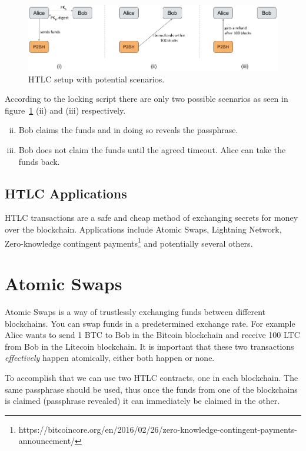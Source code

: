 \begin{figure}[h]
\begin{center}
\includegraphics[scale=0.5]{images/htlc}
\caption{HTLC setup with potential scenarios.}
\label{fig:htlc}
\end{center}
\end{figure}

According to the locking script there are only two possible scenarios as seen in figure~\ref{fig:htlc} (ii) and (iii) respectively.
\begin{enumerate}[(i)]
\setcounter{enumi}{1}
\item Bob claims the funds and in doing so reveals the passphrase.
\item Bob does not claim the funds until the agreed timeout. Alice can take the funds back.
\end{enumerate}

\subsection*{HTLC Applications}
HTLC transactions are a safe and cheap method of exchanging secrets for money over the blockchain. Applications include Atomic Swaps, Lightning Network, Zero-knowledge contingent payments\footnote{https://bitcoincore.org/en/2016/02/26/zero-knowledge-contingent-payments-announcement/} and potentially several others.



\section{Atomic Swaps}
\label{sec:atomic-swaps}
Atomic Swaps is a way of trustlessly exchanging funds between different blockchains. You can swap funds in a predetermined exchange rate. For example Alice wants to send 1 BTC to Bob in the Bitcoin blockchain and receive 100 LTC from Bob in the Litecoin blockchain. It is important that these two transactions \emph{effectively} happen atomically, either both happen or none.

To accomplish that we can use two HTLC contracts, one in each blockchain. The same passphrase should be used, thus once the funds from one of the blockchains is claimed (passphrase revealed) it can immediately be claimed in the other.


